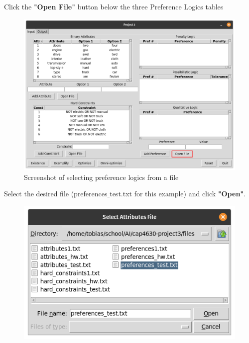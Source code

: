 \documentclass[12pt]{report}
\begin{document}
\begin{description}[leftmargin=4em]
\item [Step 1:] Click the \textbf{"Open File"} button below the three Preference Logics tables
\begin{figure}[H]
\begin{center}
\includegraphics[scale=0.275,trim=1cm 1cm 1cm 1cm]{input_preferences}
\caption{Screenshot of selecting preference logics from a file}
\end{center}
\end{figure}
\vspace{-2.5em}
\item [Step 2:] Select the desired file (preferences$\_$test.txt for this example) and click \textbf{"Open"}.
\begin{figure}[H]
\begin{center}
\includegraphics[scale=0.3,trim=1cm 1cm 1cm 1cm]{select_preferences}

\end{center}
\end{figure}
\end{description}
\end{document}
